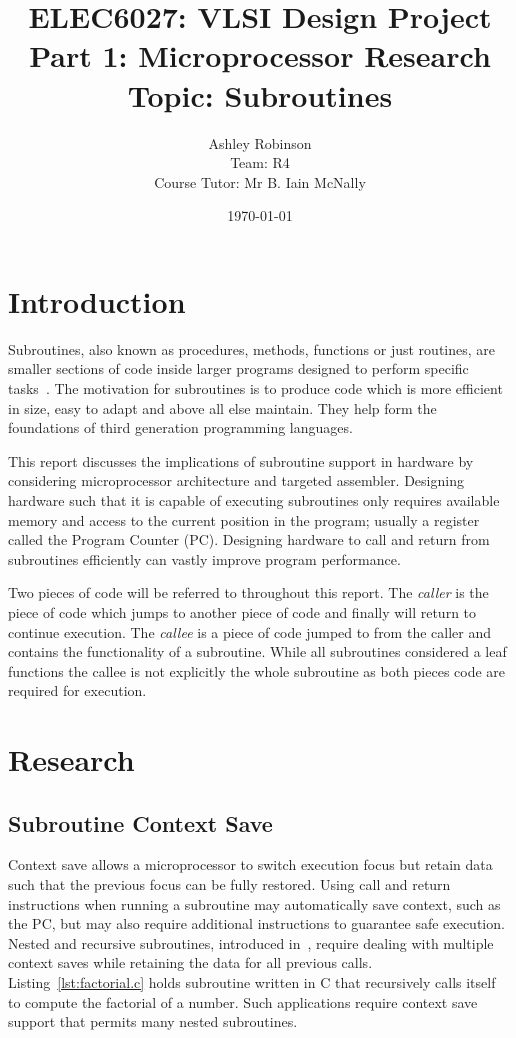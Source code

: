 \documentclass[12pt,a4paper]{article}
\title{ELEC6027: VLSI Design Project \\Part 1: Microprocessor Research\\Topic: Subroutines}
\author{Ashley Robinson\\ Team: R4\\Course Tutor: Mr B. Iain McNally}
\date{\today}
\begin{document}
\begin{titlepage}
\clearpage
\maketitle
\thispagestyle{empty}
\end{titlepage}

\tableofcontents
\clearpage

\lstset{
   frame=L,
   basicstyle=\footnotesize,        %
   captionpos=b
}


\section{Introduction}

Subroutines, also known as procedures, methods, functions or just routines, are smaller sections of code inside larger programs designed to perform specific tasks~\cite{alison}.
The motivation for subroutines is to produce code which is more efficient in size, easy to adapt and above all else maintain. 
They help form the foundations of third generation programming languages.

This report discusses the implications of subroutine support in hardware by considering microprocessor architecture and targeted assembler.
Designing hardware such that it is capable of executing subroutines only requires available memory and access to the current position in the program; usually a register called the Program Counter (PC).
Designing hardware to call and return from subroutines efficiently can vastly improve program performance. 

Two pieces of code will be referred to throughout this report.
The \emph{caller} is the piece of code which jumps to another piece of code and finally will return to continue execution.
The \emph{callee} is a piece of code jumped to from the caller and contains the functionality of a subroutine. 
While all subroutines considered a leaf functions the callee is not explicitly the whole subroutine as both pieces code are required for execution.
\section{Research}

\subsection{Subroutine Context Save }
Context save allows a microprocessor to switch execution focus but retain data such that the previous focus can be fully restored.
Using call and return instructions when running a subroutine may automatically save context, such as the PC, but may also require additional instructions to guarantee safe execution.
Nested and recursive subroutines, introduced in~\cite{IainPrograms}, require dealing with multiple context saves while retaining the data for all previous calls. 
Listing~\ref{lst:factorial.c} holds subroutine written in C that recursively calls itself to compute the factorial of a number.
Such applications require context save support that permits many nested subroutines.
\end{document}
